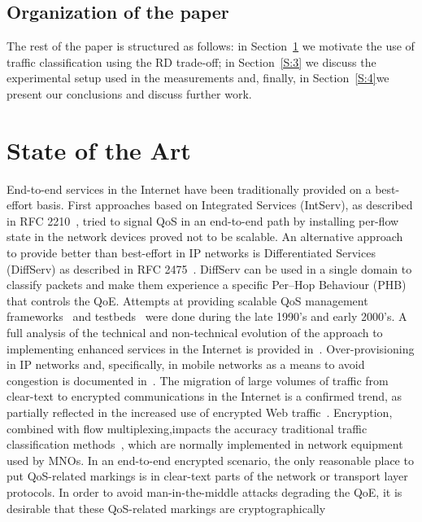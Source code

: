 \documentclass[12pt]{article}
\begin{document}
\subsection{Organization of the paper}

The rest of the paper is structured as follows: in Section~\ref{S:2} we
motivate the use of traffic classification using the RD trade-off; in
Section~\ref{S:3} we discuss the experimental setup used in the measurements
and, finally, in Section~\ref{S:4}we present our conclusions and discuss
further work.

\section{State of the Art}
\label{S:2}

End-to-end services in the Internet have been traditionally provided on a
best-effort basis. First approaches based on Integrated Services (IntServ), as
described in RFC 2210~\cite{rfc2210}, tried to signal QoS in an end-to-end path
by installing per-flow state in the network devices proved not to be scalable.
An alternative approach to provide better than best-effort in IP networks is
Differentiated Services (DiffServ) as described in RFC 2475~\cite{rfc2475}.
DiffServ can be used in a single domain to classify packets and make them
experience a specific Per–Hop Behaviour (PHB) that controls the QoE. Attempts
at providing scalable QoS management frameworks~\cite{mantar-diff-06} and
testbeds~\cite{qbone-isoc-99} were done during the late 1990's and early
2000's.  A full analysis of the technical and non-technical evolution of the
approach to implementing enhanced services in the Internet is provided
in~\cite{claffy2015}. Over-provisioning in IP networks and, specifically, in
mobile networks as a means to avoid congestion is documented
in~\cite{Martin-Geddes-2014}.  The migration of large volumes of traffic  from
clear-text to encrypted communications in the Internet is a confirmed trend, as
partially reflected in the increased use of encrypted Web
traffic~\cite{letsenc-stats}. Encryption, combined with flow
multiplexing,impacts the accuracy traditional traffic classification
methods~\cite{aceto2017}, which are normally implemented in network equipment
used by MNOs.  In an end-to-end encrypted scenario, the only reasonable place
to put QoS-related markings is in clear-text parts of the network or transport
layer protocols. In order to avoid man-in-the-middle attacks degrading the QoE,
it is desirable that these QoS-related markings are cryptographically
\end{document}
